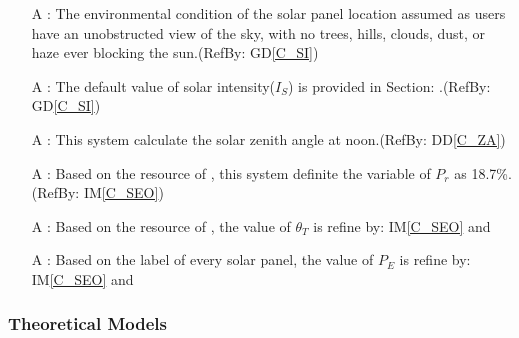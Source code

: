 \documentclass[12pt]{article}
\newcommand{\dref}[1]{GD\ref{#1}}
\newcommand{\ddref}[1]{DD\ref{#1}}
\newcounter{assumpnum} %
\newcommand{\iref}[1]{IM\ref{#1}}
\begin{document}
\begin{itemize}

\item[A\refstepcounter{assumpnum}\theassumpnum \label{a_spe}]: The environmental condition of the solar panel location assumed as users have an unobstructed view of the sky, with no trees, hills, clouds, dust, or haze ever blocking the sun.(RefBy: \dref{C_SI})\\

\item[A\refstepcounter{assumpnum}\theassumpnum \label{a_dsip}]: The default value of solar intensity($I_S$) is provided in Section: .(RefBy: \dref{C_SI})\\

\item[A\refstepcounter{assumpnum}\theassumpnum \label{a_dsia}]: This system calculate the solar zenith angle at noon.(RefBy: \ddref{C_ZA})\\

\item[A\refstepcounter{assumpnum}\theassumpnum \label{a_dp}]: Based
 on the resource of \cite{EMPA2011}, this system definite the variable of $P_r$ as 18.7\%.(RefBy: \iref{C_SEO})\\

\item[A\refstepcounter{assumpnum}\theassumpnum \label{a_tilta}]: Based
 on the resource of \cite{Charles2001}, the value of $\theta_{T}$ is refine by: \iref{C_SEO} and \\


\item[A\refstepcounter{assumpnum}\theassumpnum \label{a_panele}]: Based
 on the label of every solar panel, the value of $P_E$ is refine by: \iref{C_SEO} and \\

\end{itemize}

\subsubsection{Theoretical Models}\label{sec_theoretical}
\end{document}
